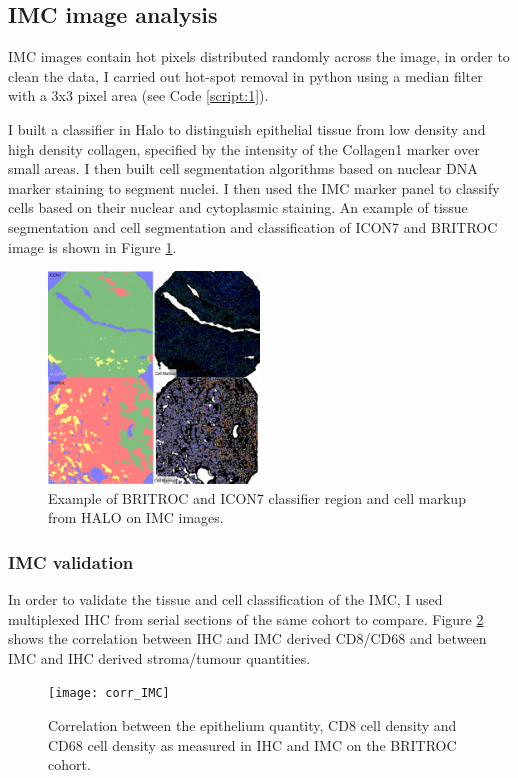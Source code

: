 \subsection{IMC image analysis}
 IMC images contain hot pixels distributed randomly across the image, in order to clean the data, I carried out hot-spot removal in python using a median filter with a 3x3 pixel area (see Code \ref{script:1}).
 
 I built a classifier in Halo to distinguish epithelial tissue from low density and high density collagen, specified by the intensity of the Collagen1 marker over small areas.
 I then built cell segmentation algorithms based on nuclear DNA marker staining to segment nuclei. I then used the IMC marker panel to classify cells based on their nuclear and cytoplasmic staining. An example of tissue segmentation and cell segmentation and classification of ICON7 and BRITROC image is shown in Figure \ref{fig:IMC_example}.
 
 \begin{figure}
     \centering
     \includegraphics[width=0.5\textwidth]{Chapter4/figs/Thesis-09.png}
     \caption{Example of BRITROC and ICON7 classifier region and cell markup from HALO on IMC images.}
     \label{fig:IMC_example}
 \end{figure}
 
\subsubsection{IMC validation}

In order to validate the tissue and cell classification of the IMC, I used multiplexed IHC from serial sections of the same cohort to compare. Figure \ref{fig:IMC_IHC_corr} shows the correlation between IHC and IMC derived CD8/CD68 and between IMC and IHC derived stroma/tumour quantities.

\begin{figure}
    \centering
    \texttt{[image: corr\_IMC]}
    \caption{Correlation between the epithelium quantity, CD8 cell density and CD68 cell density as measured in IHC and IMC on the BRITROC cohort.}
    \label{fig:IMC_IHC_corr}
\end{figure}

